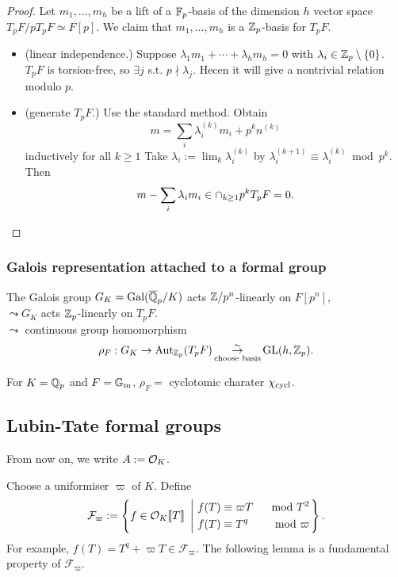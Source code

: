 \begin{proof}
    Let $m_1, \dots, m_h$ be a lift of a $\mathbb{F}_p$-basis of the dimension $h$ vector space $T_pF/pT_pF\simeq F[p]$.
    We claim that $m_1, \dots, m_h$ is a $\mathbb{Z}_p$-basis for $T_pF$.
    \begin{itemize}
        \item (linear independence.)
        Suppose $\lambda_1m_1 + \cdots + \lambda_h m_h = 0$ with $\lambda_i\in\mathbb{Z}_p\setminus \{0\}$.
        $T_pF$ is torsion-free, so $\exists j$ s.t. $p\nmid \lambda_j$.
        Hecen it will give a nontrivial relation modulo $p$.
        \item (generate $T_pF$.)
        Use the standard method.
        Obtain \[m = \sum_i \lambda_i^{(k)} m_i + p^kn^{(k)}\] inductively for all $k\ge 1$
        Take $\lambda_i := \lim_k\lambda_i^{(k)}$
        by $\lambda_i^{(k+1)}\equiv \lambda_i^{(k)}\bmod p^{k}$.
        Then \[m - \sum_{i}\lambda_im_i\in\cap_{k\ge 1}p^kT_pF = 0.\qedhere\]
    \end{itemize}
\end{proof}


\subsubsection{Galois representation attached to a formal group}
The Galois group $G_K = \operatorname{Gal}(\overline{\mathbb{Q}}_p/K)$ acts $\mathbb{Z}/p^n$-linearly on $F[p^n]$,\\
$\leadsto G_K$ acts $\mathbb{Z}_p$-linearly on $T_pF$.\\
$\leadsto$ continuous group homomorphism \[\rho_F : G_K\to\operatorname{Aut}_{\mathbb{Z}_p}(T_pF)\mathop{\stackrel{\sim}{\rightarrow}}_{\text{choose basis}} \operatorname{GL}(h, \mathbb{Z}_p).\]
\begin{example}
    For $K = \mathbb{Q}_p$ and $F = {\mathbb{G}_{\mathrm{m}}}$, $\rho_F = $ cyclotomic charater $\chi_{\mathrm{cycl}}$.
\end{example}






\subsection{Lubin-Tate formal groups}
From now on, we write $A := \mathcal{O}_K$.

Choose a uniformiser $\varpi$ of $K$. Define
\[\mathcal{F}_\varpi := \left\{f\in\mathcal{O}_K\llbracket T \rrbracket\ \left|\ \begin{aligned}
    &f(T) \equiv \varpi T&\mod {T^2} \\
    &f(T)\equiv T^q&\mod \varpi
\end{aligned}\right.\right\}.\]
For example, $f(T) = T^q + \varpi T\in\mathcal{F}_\varpi$.
The following lemma is a fundamental property of $\mathcal{F}_\varpi$.


